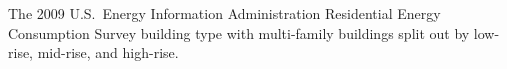 The 2009 U.S.~Energy Information Administration Residential Energy Consumption Survey  building type with multi-family buildings split out by low-rise, mid-rise, and high-rise.
